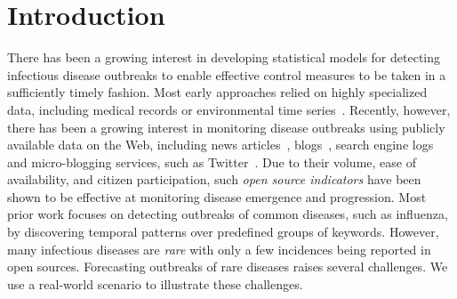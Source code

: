 \documentclass[twoside,leqno,twocolumn]{article}
\newcommand{\fullmodel}{{{\sf SourceSeer}}\xspace}
\begin{document}
\maketitle
\begin{abstract}
Rapidly increasing volumes of news feeds from diverse data sources, such as online newspapers, Twitter and online blogs are proving to be extremely valuable resources in helping anticipate, detect, and forecast outbreaks of rare diseases. This paper presents \fullmodel, a novel algorithmic framework that combines spatio-temporal topic models with source-based anomaly detection techniques to effectively forecast the emergence and progression of infectious rare diseases. \fullmodel is capable of discovering the location focus of each source allowing sources to be used as experts with varying degrees of authoritativeness. To fuse the individual source predictions into a final outbreak prediction we employ a multiplicative weights algorithm taking into account the accuracy of each source. We evaluate the performance of \fullmodel using incidence data for hantavirus syndromes in multiple countries of Latin America provided by HealthMap over a timespan of fifteen months. We demonstrate that \fullmodel makes predictions of increased accuracy compared to several baselines and is capable of forecasting disease outbreaks in a timely manner even when no outbreaks were previously reported.  
\end{abstract}

\section{Introduction}
\label{sec:intro}
There has been a growing interest in developing statistical models for detecting infectious disease outbreaks to enable effective control measures to be taken in a sufficiently timely fashion. Most early approaches relied on highly specialized data, including medical records or environmental time series~\cite{wong:02,wong:03}.  Recently, however, there has been a growing interest in monitoring disease outbreaks using publicly available data on the Web, including news articles~\cite{brownstein:2008,linge:09}, blogs~\cite{corley:10}, search engine logs~\cite{ginsberg:09} and micro-blogging services, such as Twitter~\cite{culotta:2010,parker:13, paul:11}. Due to their volume, ease of availability, and citizen participation, such {\em open source indicators} have been shown to be effective at monitoring disease emergence and progression. Most prior work focuses on detecting outbreaks of common diseases, such as influenza, by discovering temporal patterns over predefined groups of keywords. However, many infectious diseases are {\em rare} with only a few incidences being reported in open sources. Forecasting outbreaks of rare diseases raises several challenges. We use a real-world scenario to illustrate these challenges.
\end{document}
